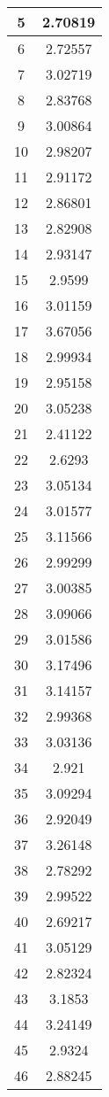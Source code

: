 \begin{table}[h]
\begin{subtable}[h]{2in}
{\begin{tabular}{|c|c|}
5	&	2.70819	\\	\hline
6	&	2.72557	\\	\hline
7	&	3.02719	\\	\hline
8	&	2.83768	\\	\hline
9	&	3.00864	\\	\hline
10	&	2.98207	\\	\hline
11	&	2.91172	\\	\hline
12	&	2.86801	\\	\hline
13	&	2.82908	\\	\hline
14	&	2.93147	\\	\hline
15	&	2.9599	\\	\hline
16	&	3.01159	\\	\hline
17	&	3.67056	\\	\hline
18	&	2.99934	\\	\hline
19	&	2.95158	\\	\hline
20	&	3.05238	\\	\hline
21	&	2.41122	\\	\hline
22	&	2.6293	\\	\hline
23	&	3.05134	\\	\hline
24	&	3.01577	\\	\hline
25	&	3.11566	\\	\hline
26	&	2.99299	\\	\hline
27	&	3.00385	\\	\hline
28	&	3.09066	\\	\hline
29	&	3.01586	\\	\hline
30	&	3.17496	\\	\hline
31	&	3.14157	\\	\hline
32	&	2.99368	\\	\hline
33	&	3.03136	\\	\hline
34	&	2.921	\\	\hline
35	&	3.09294	\\	\hline
36	&	2.92049	\\	\hline
37	&	3.26148	\\	\hline
38	&	2.78292	\\	\hline
39	&	2.99522	\\	\hline
40	&	2.69217	\\	\hline
41	&	3.05129	\\	\hline
42	&	2.82324	\\	\hline
43	&	3.1853	\\	\hline
44	&	3.24149	\\	\hline
45	&	2.9324	\\	\hline
46	&	2.88245	\\	\hline

\end{tabular}}
\end{subtable}
\end{table}
